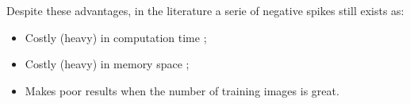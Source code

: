 Despite these advantages, in the literature a serie of negative spikes still exists as:
\begin{itemize}
\item Costly (heavy) in computation time ;
\item Costly (heavy)  in memory space ;
\item Makes poor results when the number of training images is great.
\end{itemize} 


















 
 
 














































 
 
 
 
 
 
 
 
 



